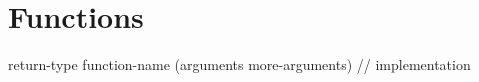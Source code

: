 \section{Functions}


return-type
function-name (arguments
               more-arguments)
{
    // implementation
}
